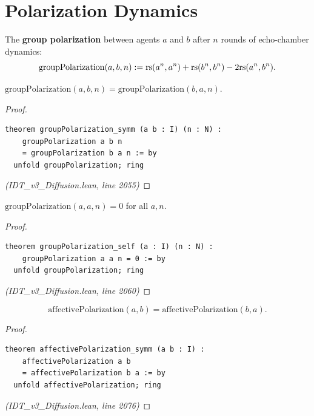 \section{Polarization Dynamics}

\begin{definition}
\label{def:group-polarization}
The \textbf{group polarization} between agents $a$ and $b$ after $n$ rounds of
echo-chamber dynamics:
\[
  \mathrm{groupPolarization}(a, b, n) := \mathrm{rs}(a^n, a^n) + \mathrm{rs}(b^n, b^n) - 2\mathrm{rs}(a^n, b^n).
\]
\end{definition}

\begin{theorem}
\label{thm:polarization-symm}
$\mathrm{groupPolarization}(a, b, n) = \mathrm{groupPolarization}(b, a, n)$.
\end{theorem}

\begin{proof}
\begin{lstlisting}
theorem groupPolarization_symm (a b : I) (n : N) :
    groupPolarization a b n
    = groupPolarization b a n := by
  unfold groupPolarization; ring
\end{lstlisting}
\textit{(IDT\_v3\_Diffusion.lean, line 2055)}
\end{proof}

\begin{theorem}
\label{thm:polarization-self}
$\mathrm{groupPolarization}(a, a, n) = 0$ for all $a, n$.
\end{theorem}

\begin{proof}
\begin{lstlisting}
theorem groupPolarization_self (a : I) (n : N) :
    groupPolarization a a n = 0 := by
  unfold groupPolarization; ring
\end{lstlisting}
\textit{(IDT\_v3\_Diffusion.lean, line 2060)}
\end{proof}

\begin{theorem}
\label{thm:affective-symmetric}
\[
  \mathrm{affectivePolarization}(a, b) = \mathrm{affectivePolarization}(b, a).
\]
\end{theorem}

\begin{proof}
\begin{lstlisting}
theorem affectivePolarization_symm (a b : I) :
    affectivePolarization a b
    = affectivePolarization b a := by
  unfold affectivePolarization; ring
\end{lstlisting}
\textit{(IDT\_v3\_Diffusion.lean, line 2076)}
\end{proof}

